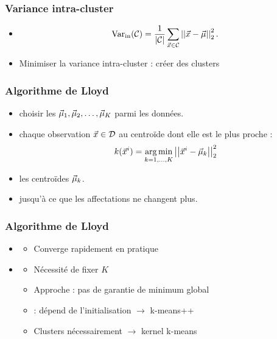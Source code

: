 \begin{frame}
  \frametitle{Variance intra-cluster}
  \begin{itemize}
  \item {}
    \[
            \text{Var}_\text{in}(\mathcal{C}) = \frac1{\lvert \mathcal{C} \rvert} \sum_{\vec{x} \in \mathcal{C}}
      \left|\left|\vec{x} - \vec{\mu}\right|\right|_2^2.
    \]
  \item Minimiser la variance intra-cluster : créer des clusters 
  \end{itemize}
\end{frame}

\begin{frame}
  \frametitle{Algorithme de Lloyd}
  \begin{itemize}
  \item {} choisir les $\vec{\mu}_1, \vec{\mu}_2, \ldots, \vec{\mu}_K$ parmi les données. 
  \item {} chaque observation $\vec{x} \in \mathcal{D}$ au centroïde dont elle est le plus proche :
    \begin{equation*}
      k(\vec{x}^i) = \operatorname*{arg\,min}_{k=1, \ldots, K}\left|\left|\vec{x}^i - \vec{\mu}_k\right|\right|_2^2
    \end{equation*}
  \item {} les centroïdes $\vec{\mu}_k$. 
  \item {} jusqu'à ce que les affectations ne changent plus. 
  \end{itemize}
\end{frame}

\begin{frame}
  \frametitle{Algorithme de Lloyd}
  \begin{itemize}
  \item {}
    \begin{itemize}
    \item Converge rapidement en pratique
    \end{itemize}
    \pause
  \item {}
    \begin{itemize}
    \item Nécessité de fixer $K$ 
    \item Approche  : pas de garantie de minimum global
    \item {} : dépend de l'initialisation \pause $\rightarrow$ k-means++ 
    \item Clusters nécessairement  \pause $\rightarrow$ kernel k-means
    \end{itemize}
  \end{itemize}
\end{frame}




